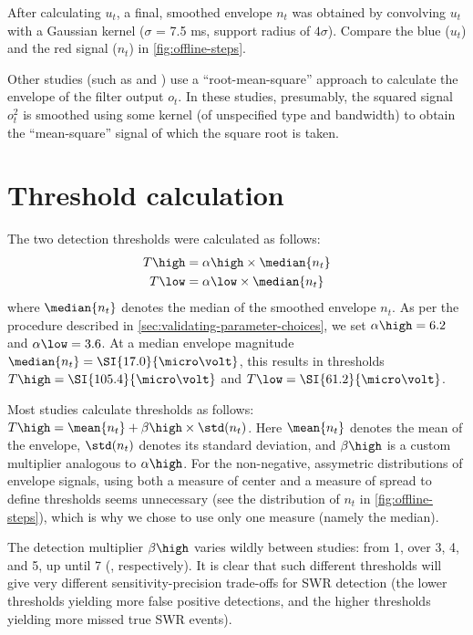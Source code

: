 After calculating $u_t$, a final, smoothed envelope $n_t$ was obtained by convolving $u_t$ with a Gaussian kernel ($\sigma$ = 7.5 ms, support radius of $4 \sigma$). Compare the blue ($u_t$) and the red signal ($n_t$) in \cref{fig:offline-steps}.

Other studies (such as \cite{Nadasdy1999} and \cite{Csicsvari2000}) use a ``root-mean-square'' approach to calculate the envelope of the filter output $o_t$. In these studies, presumably, the squared signal $o_t^2$ is smoothed using some kernel (of unspecified type and bandwidth) to obtain the ``mean-square'' signal of which the square root is taken.



\section{Threshold calculation}

The two detection thresholds were calculated as follows:
\begin{align}
\label{eq:thresholds-symbolic}
T\high &= \alpha\high \times \median{n_t} \\
T\low  &= \alpha\low  \times \median{n_t}
\end{align}
%
where $\median{n_t}$ denotes the median of the smoothed envelope $n_t$. As per the procedure described in \cref{sec:validating-parameter-choices}, we set $\alpha\high = 6.2$ and $\alpha\low = 3.6$. At a median envelope magnitude $\median{n_t} = \SI{17.0}{\micro\volt}$, this results in thresholds $T\high = \SI{105.4}{\micro\volt}$ and $T\low = \SI{61.2}{\micro\volt}$.

Most studies calculate thresholds as follows: $T\high = \mean{n_t} + \beta\high \times \std(n_t)$. Here $\mean{n_t}$ denotes the mean of the envelope, $\std(n_t)$ denotes its standard deviation, and $\beta\high$ is a custom multiplier analogous to $\alpha\high$. For the non-negative, assymetric distributions of envelope signals, using both a measure of center and a measure of spread to define thresholds seems unnecessary (see the distribution of $n_t$ in \cref{fig:offline-steps}), which is why we chose to use only one measure (namely the median).

The detection multiplier $\beta\high$ varies wildly between studies: from 1, over 3, 4, and 5, up until 7 (\cite{Csicsvari2000,Dutta2018,Behrens2005,Sadowski2016,Nadasdy1999}, respectively).\footnotemark{} It is clear that such different thresholds will give very different sensitivity-precision trade-offs for SWR detection (the lower thresholds yielding more false positive detections, and the higher thresholds yielding more missed true SWR events).

